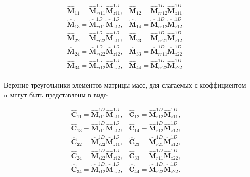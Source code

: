 \begin{equation*}
	\begin{array}{ll}
		\hat{\textbf{M}}_{11} = \hat{\textbf{M}}^{1D}_{rr11}\hat{\textbf{M}}^{1D}_{z11}, & \hat{\textbf{M}}_{12} = \hat{\textbf{M}}^{1D}_{rr12}\hat{\textbf{M}}^{1D}_{z11},\\
		\hat{\textbf{M}}_{13} = \hat{\textbf{M}}^{1D}_{rr11}\hat{\textbf{M}}^{1D}_{z12}, & \hat{\textbf{M}}_{14} = \hat{\textbf{M}}^{1D}_{rr12}\hat{\textbf{M}}^{1D}_{z12},\\
		\hat{\textbf{M}}_{22} = \hat{\textbf{M}}^{1D}_{rr22}\hat{\textbf{M}}^{1D}_{z11}, & \hat{\textbf{M}}_{23} = \hat{\textbf{M}}^{1D}_{rr21}\hat{\textbf{M}}^{1D}_{z12},\\
		\hat{\textbf{M}}_{24} = \hat{\textbf{M}}^{1D}_{rr22}\hat{\textbf{M}}^{1D}_{z12}, & \hat{\textbf{M}}_{33} = \hat{\textbf{M}}^{1D}_{rr11}\hat{\textbf{M}}^{1D}_{z22},\\
		\hat{\textbf{M}}_{34} = \hat{\textbf{M}}^{1D}_{rr12}\hat{\textbf{M}}^{1D}_{z22}, & \hat{\textbf{M}}_{44} = \hat{\textbf{M}}^{1D}_{rr22}\hat{\textbf{M}}^{1D}_{z22}.\\
	\end{array}
\end{equation*}


Верхние треугольники элементов матрицы масс, для слагаемых с коэффициентом $\sigma$ могут быть представлены в виде:

\begin{equation*}
	\begin{array}{ll}
		\hat{\textbf{C}}_{11} = \hat{\textbf{M}}^{1D}_{r11}\hat{\textbf{M}}^{1D}_{z11}, & \hat{\textbf{C}}_{12} = \hat{\textbf{M}}^{1D}_{r12}\hat{\textbf{M}}^{1D}_{z11},\\
		\hat{\textbf{C}}_{13} = \hat{\textbf{M}}^{1D}_{r11}\hat{\textbf{M}}^{1D}_{z12}, & \hat{\textbf{C}}_{14} = \hat{\textbf{M}}^{1D}_{r12}\hat{\textbf{M}}^{1D}_{z12},\\
		\hat{\textbf{C}}_{22} = \hat{\textbf{M}}^{1D}_{r22}\hat{\textbf{M}}^{1D}_{z11}, & \hat{\textbf{C}}_{23} = \hat{\textbf{M}}^{1D}_{r21}\hat{\textbf{M}}^{1D}_{z12},\\
		\hat{\textbf{C}}_{24} = \hat{\textbf{M}}^{1D}_{r22}\hat{\textbf{M}}^{1D}_{z12}, & \hat{\textbf{C}}_{33} = \hat{\textbf{M}}^{1D}_{r11}\hat{\textbf{M}}^{1D}_{z22},\\
		\hat{\textbf{C}}_{34} = \hat{\textbf{M}}^{1D}_{r12}\hat{\textbf{M}}^{1D}_{z22}, & \hat{\textbf{C}}_{44} = \hat{\textbf{M}}^{1D}_{r22}\hat{\textbf{M}}^{1D}_{z22}.\\
	\end{array}
\end{equation*}

